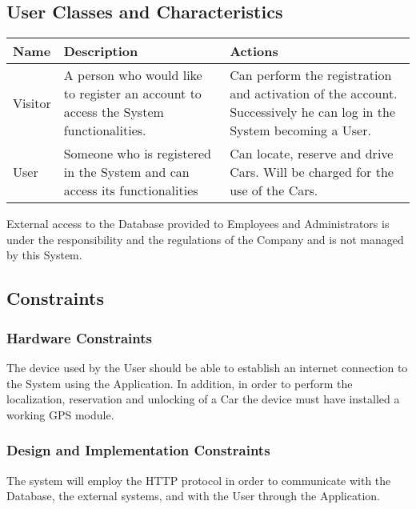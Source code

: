 \subsection{User Classes and Characteristics}
\begin{center}
  \begin{tabular}{|p{}|p{}|p{}|}
    \hline
    \textbf{Name} & \textbf{Description} & \textbf{Actions} \\ \hline
    Visitor & A person who would like to register an account to access the System functionalities. & Can perform the registration and activation of the account. Successively he can log in the System becoming a User.\\\hline
    User & Someone who is registered in the System and can access its functionalities & Can locate, reserve and drive Cars. Will be charged for the use of the Cars. \\ \hline
    \end{tabular}
\end{center}
\vspace{5mm}
External access to the Database provided to Employees and Administrators is under the responsibility and the regulations of the Company and is not managed by this System.


\subsection{Constraints}
\subsubsection{Hardware Constraints}\label{OE}
The device used by the User should be able to establish an internet connection to the System using the Application. In addition, in order to perform the localization, reservation and unlocking of a Car the device must have installed a working GPS module. 

\subsubsection{Design and Implementation Constraints}
The system will employ the HTTP protocol in order to communicate with the Database, the external systems, and with the User through the Application. 

